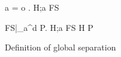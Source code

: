 \begin{figure}
  {a = \ocap \implies \forall o \in {}. \:  }
  {H;a \vdash FS \tsep \gsep}

  \RuleSpace{}

  {\forall FS|_a^d \in P. \: H;a \vdash FS \tsep \gsep}
  {H \vdash P \tsep \gsep}

  \caption{Definition of global separation}
  \label{fig:def_gsep}
\end{figure}





